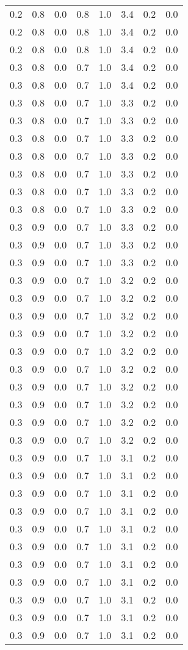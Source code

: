 \begin{tabular}{L{1in}|L{1in}|L{1in}|L{1in}|L{1in}|L{1in}|L{1in}|L{1in}}
0.2&0.8&0.0&0.8&1.0&3.4&0.2&0.0\\
0.2&0.8&0.0&0.8&1.0&3.4&0.2&0.0\\
0.2&0.8&0.0&0.8&1.0&3.4&0.2&0.0\\
0.3&0.8&0.0&0.7&1.0&3.4&0.2&0.0\\
0.3&0.8&0.0&0.7&1.0&3.4&0.2&0.0\\
0.3&0.8&0.0&0.7&1.0&3.3&0.2&0.0\\
0.3&0.8&0.0&0.7&1.0&3.3&0.2&0.0\\
0.3&0.8&0.0&0.7&1.0&3.3&0.2&0.0\\
0.3&0.8&0.0&0.7&1.0&3.3&0.2&0.0\\
0.3&0.8&0.0&0.7&1.0&3.3&0.2&0.0\\
0.3&0.8&0.0&0.7&1.0&3.3&0.2&0.0\\
0.3&0.8&0.0&0.7&1.0&3.3&0.2&0.0\\
0.3&0.9&0.0&0.7&1.0&3.3&0.2&0.0\\
0.3&0.9&0.0&0.7&1.0&3.3&0.2&0.0\\
0.3&0.9&0.0&0.7&1.0&3.3&0.2&0.0\\
0.3&0.9&0.0&0.7&1.0&3.2&0.2&0.0\\
0.3&0.9&0.0&0.7&1.0&3.2&0.2&0.0\\
0.3&0.9&0.0&0.7&1.0&3.2&0.2&0.0\\
0.3&0.9&0.0&0.7&1.0&3.2&0.2&0.0\\
0.3&0.9&0.0&0.7&1.0&3.2&0.2&0.0\\
0.3&0.9&0.0&0.7&1.0&3.2&0.2&0.0\\
0.3&0.9&0.0&0.7&1.0&3.2&0.2&0.0\\
0.3&0.9&0.0&0.7&1.0&3.2&0.2&0.0\\
0.3&0.9&0.0&0.7&1.0&3.2&0.2&0.0\\
0.3&0.9&0.0&0.7&1.0&3.2&0.2&0.0\\
0.3&0.9&0.0&0.7&1.0&3.1&0.2&0.0\\
0.3&0.9&0.0&0.7&1.0&3.1&0.2&0.0\\
0.3&0.9&0.0&0.7&1.0&3.1&0.2&0.0\\
0.3&0.9&0.0&0.7&1.0&3.1&0.2&0.0\\
0.3&0.9&0.0&0.7&1.0&3.1&0.2&0.0\\
0.3&0.9&0.0&0.7&1.0&3.1&0.2&0.0\\
0.3&0.9&0.0&0.7&1.0&3.1&0.2&0.0\\
0.3&0.9&0.0&0.7&1.0&3.1&0.2&0.0\\
0.3&0.9&0.0&0.7&1.0&3.1&0.2&0.0\\
0.3&0.9&0.0&0.7&1.0&3.1&0.2&0.0\\
0.3&0.9&0.0&0.7&1.0&3.1&0.2&0.0\\

\end{tabular}
